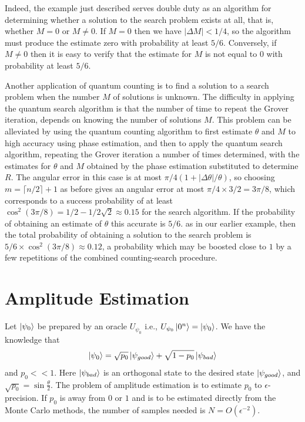 Indeed, the example just described serves double duty as an algorithm for determining whether a solution to the search problem exists at all, that is, whether $M=0$ or $M\neq 0$. If $M=0$ then we have $|\Delta M|<1/4$, so the algorithm must produce the estimate zero with probability at least $5/6$. Conversely, if $M\neq0$ then it is easy to verify that the estimate for $M$ is not equal to $0$ with probability at least $5/6$.

Another application of quantum counting is to find a solution to a search problem when the number $M$ of solutions is unknown. The difficulty in applying the quantum search algorithm is that the number of time to repeat the Grover iteration, depends on knowing the number of solutions $M$. This problem can be alleviated by using the quantum counting algorithm to first estimate $\theta$ and $M$ to high accuracy using phase estimation, and then to apply the quantum search algorithm, repeating the Grover iteration a number of times determined, with the estimates for $\theta$ and $M$ obtained by the phase estimation substituted to determine $R$. The angular error in this case is at most $\pi/4(1+|\Delta \theta|/\theta)$, so choosing $m=\lceil n/2\rceil +1$ as before gives an angular error at most $\pi/4 \times 3/2=3\pi/8$, which corresponds to a success probability of at least $\cos^2(3\pi/8)=1/2-1/2\sqrt{2}\approx 0.15$ for the search algorithm. If the probability of obtaining an estimate of $\theta$ this accurate is $5/6$. as in our earlier example, then the total probability of obtaining a solution to the search problem is $5/6 \times \cos^2(3\pi/8)\approx 0.12$, a probability which may be boosted close to $1$ by a few repetitions of the combined counting-search procedure.

\section{Amplitude Estimation}
Let $\ket{\psi_0}$ be prepared by an oracle $U_{\psi_0}$ i.e., $U_{\psi_0}\ket{0^n}=\ket{\psi_0}$. We have the knowledge that 
\[
\ket{\psi_0}=\sqrt{p_0}\ket{\psi_{good}} + \sqrt{1-p_0} \ket{\psi_{bad}}
\]
and $p_0 <<1$. Here $\ket{\psi_{bad}}$ is an orthogonal state to the desired state $\ket{\psi_{good}}$, and $\sqrt{p_0}=\sin\frac{\theta}{2}$. The problem of amplitude estimation is to estimate $p_0$ to $\epsilon$-precision. If $p_0$ is away from $0$ or $1$ and is to be estimated directly from the Monte Carlo methods, the number of samples needed is $N=O(\epsilon^{-2})$.

